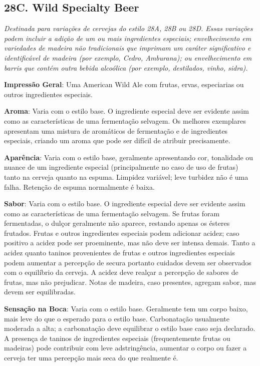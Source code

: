 \subsection*{28C. Wild Specialty Beer}
\textit{Destinada para variações de cervejas do estilo 28A, 28B ou 28D. Essas variações podem incluir a adição de um ou mais ingredientes especiais; envelhecimento em variedades de madeira não tradicionais que imprimam um caráter significativo e identificável de madeira (por exemplo, Cedro, Amburana); ou envelhecimento em barris que contém outra bebida alcoólica (por exemplo, destilados, vinho, sidra).}

\textbf{Impressão Geral}: Uma American Wild Ale com frutas, ervas, especiarias ou outros ingredientes especiais.

\textbf{Aroma}: Varia com o estilo base. O ingrediente especial deve ser evidente assim como as características de uma fermentação selvagem. Os melhores exemplares apresentam uma mistura de aromáticos de fermentação e de ingredientes especiais, criando um aroma que pode ser difícil de atribuir precisamente.

\textbf{Aparência}: Varia com o estilo base, geralmente apresentando cor, tonalidade ou nuance de um ingrediente especial (principalmente no caso de uso de frutas) tanto na cerveja quanto na espuma. Limpidez variável; leve turbidez não é uma falha. Retenção de espuma normalmente é baixa.

\textbf{Sabor}: Varia com o estilo base. O ingrediente especial deve ser evidente assim como as características de uma fermentação selvagem. Se frutas foram fermentadas, o dulçor geralmente não aparece, restando apenas os ésteres frutados. Frutas e outros ingredientes especiais podem adicionar acidez; caso positivo a acidez pode ser proeminente, mas não deve ser intensa demais. Tanto a acidez quanto taninos provenientes de frutas e outros ingredientes especiais podem aumentar a percepção de secura portanto cuidados devem ser observados com o equilíbrio da cerveja. A acidez deve realçar a percepção de sabores de frutas, mas não prejudicar. Notas de madeira, caso presentes, agregam sabor, mas devem ser equilibradas.

\textbf{Sensação na Boca}: Varia com o estilo base. Geralmente tem um corpo baixo, mais leve do que o esperado para o estilo base. Carbonatação usualmente moderada a alta; a carbonatação deve equilibrar o estilo base caso seja declarado. A presença de taninos de ingredientes especiais (frequentemente frutas ou madeiras) pode contribuir com leve adstringência, aumentar o corpo ou fazer a cerveja ter uma percepção mais seca do que realmente é.

